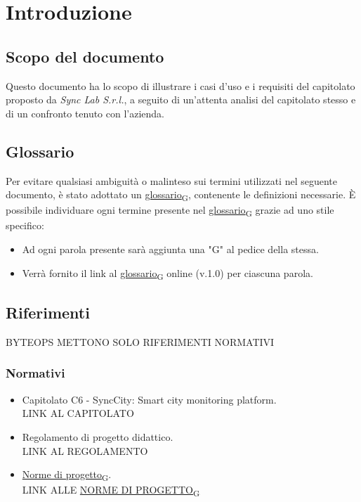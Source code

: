 \section{Introduzione}
\setcounter{subsection}{0}
\subsection{Scopo del documento}
Questo documento ha lo scopo di illustrare i casi d'uso e i requisiti del capitolato proposto da \textit{Sync Lab S.r.l.}, a seguito di un'attenta analisi del capitolato stesso e di un confronto tenuto con l'azienda.
\subsection{Glossario}
Per evitare qualsiasi ambiguità o malinteso sui termini utilizzati nel seguente documento, è stato adottato un \href{https://7last.github.io/docs/rtb/documentazione-interna/glossario#glossario}{glossario\textsubscript{G}}, contenente le definizioni necessarie. È possibile individuare ogni termine presente nel \href{https://7last.github.io/docs/rtb/documentazione-interna/glossario#glossario}{glossario\textsubscript{G}} grazie ad uno stile specifico:
\begin{itemize}
    \item Ad ogni parola presente sarà aggiunta una "G" al pedice della stessa.
    \item Verrà fornito il link al \href{https://7last.github.io/docs/rtb/documentazione-interna/glossario#glossario}{glossario\textsubscript{G}} online (v.1.0) per ciascuna parola.
\end{itemize}

\subsection{Riferimenti} BYTEOPS METTONO SOLO RIFERIMENTI NORMATIVI
    \subsubsection{Normativi}
    \begin{itemize}
        \item Capitolato C6 - SyncCity: Smart city monitoring platform.\\
        LINK AL CAPITOLATO
        \item Regolamento di progetto didattico.\\
        LINK AL REGOLAMENTO
        \item \href{https://7last.github.io/docs/rtb/documentazione-interna/glossario#norme-di-progetto}{Norme di progetto\textsubscript{G}}.\\
        LINK ALLE \href{https://7last.github.io/docs/rtb/documentazione-interna/glossario#norme-di-progetto}{NORME DI PROGETTO\textsubscript{G}}
    \end{itemize}
        
       
